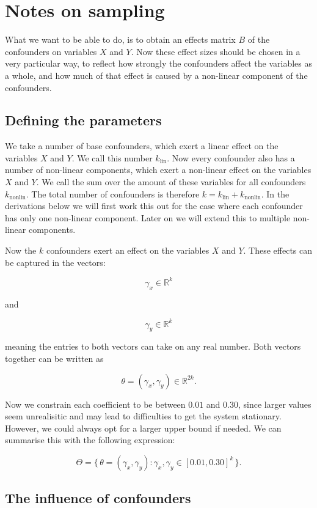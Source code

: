 \documentclass{article}
\begin{document}
\section*{Notes on sampling}
What we want to be able to do, is to obtain an effects matrix $B$ of the confounders on variables $X$ and $Y$. Now these effect
sizes should be chosen in a very particular way, to reflect how strongly the confounders affect the variables as a whole, and how
much of that effect is caused by a non-linear component of the confounders. 

\subsection*{Defining the parameters}
We take a number of base confounders, which exert a linear effect on the variables $X$ and $Y$. We call this number $k_{\text{lin}}$. Now every confounder
also has a number of non-linear components, which exert a non-linear effect on the variables $X$ and $Y$. We call the sum over the amount of these
variables for all confounders $k_{\text{nonlin}}$. The total number of confounders is therefore $k = k_{\text{lin}} + k_{\text{nonlin}}$. In the derivations below we will
first work this out for the case where each confounder has only one non-linear component. Later on we will extend this to multiple non-linear components.

\noindent
Now the $k$ confounders exert an effect on the variables $X$ and $Y$. These effects can be captured in the vectors:

\[
\gamma_{x} \in \mathbb{R}^k
\]

and

\[
\gamma_{y} \in \mathbb{R}^k
\]

\noindent
meaning the entries to both vectors can take on any real number. Both vectors together can be written as

\[
\theta = (\gamma_{x}, \gamma_{y}) \in \mathbb{R}^{2k}.
\]

\noindent
Now we constrain each coefficient to be between $0.01$ and $0.30$, since larger values seem unrealisitic and may lead to difficulties to get the system stationary.
However, we could always opt for a larger upper bound if needed. We can summarise this with the following expression:

\[
\Theta = \{\, \theta = (\gamma_x, \gamma_y) : \gamma_x, \gamma_y \in [0.01, 0.30]^k \,\}.
\]

\subsection*{The influence of confounders}
\end{document}
